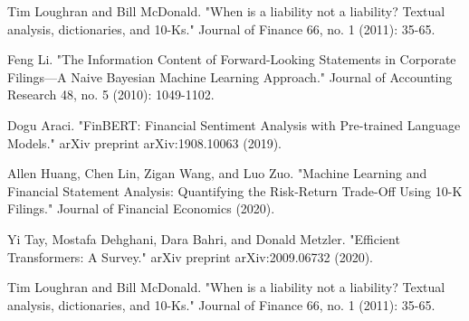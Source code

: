 \documentclass[12pt]{article}
\begin{document}
\begin{thebibliography}{}
Tim Loughran and Bill McDonald. "When is a liability not a liability? Textual analysis, dictionaries, and 10-Ks." Journal of Finance 66, no. 1 (2011): 35-65.

Feng Li. "The Information Content of Forward-Looking Statements in Corporate Filings—A Naive Bayesian Machine Learning Approach." Journal of Accounting Research 48, no. 5 (2010): 1049-1102.

Dogu Araci. "FinBERT: Financial Sentiment Analysis with Pre-trained Language Models." arXiv preprint arXiv:1908.10063 (2019).

Allen Huang, Chen Lin, Zigan Wang, and Luo Zuo. "Machine Learning and Financial Statement Analysis: Quantifying the Risk-Return Trade-Off Using 10-K Filings." Journal of Financial Economics (2020).

Yi Tay, Mostafa Dehghani, Dara Bahri, and Donald Metzler. "Efficient Transformers: A Survey." arXiv preprint arXiv:2009.06732 (2020).

Tim Loughran and Bill McDonald. "When is a liability not a liability? Textual analysis, dictionaries, and 10-Ks." Journal of Finance 66, no. 1 (2011): 35-65.


\end{thebibliography}
\end{document}
